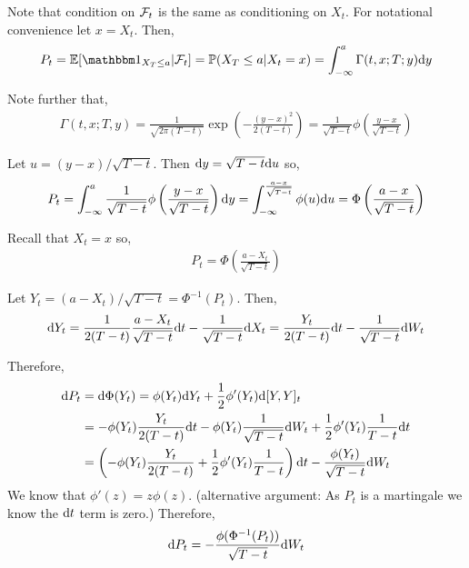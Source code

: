 \begin{solution}[Solution]
Note that condition on \( \mathcal{F}_t \) is the same as conditioning on \( X_t \). For notational convenience let \( x=X_t \). Then,
\begin{align*}
    P_t = \EE[\bOne_{X_T\leq a} | \cF_t] = \PP(X_T\leq a | X_t = x)
    = \int_{-\infty}^a \Gamma(t,x;T;y)\d y
\end{align*}

Note further that,
\begin{align*}
    \Gamma(t,x;T,y) = \frac{1}{\sqrt{2\pi (T-t)}}\exp \left( -\frac{(y-x)^2}{2(T-t)} \right) 
    = \frac{1}{\sqrt{T-t}}\phi \left( \frac{y-x}{\sqrt{T-t}} \right)
\end{align*}

    Let \( u = (y-x)/\sqrt{T-t} \). Then \( \mathrm{d} y = \sqrt{T-t} \mathrm{d} u \) so,
    \begin{align*}
       P_t
        = \int_{-\infty}^{a}  \frac{1}{\sqrt{T-t}}\phi \left( \frac{y-x}{\sqrt{T-t}} \right)\mathrm{d} y
        = \int_{-\infty}^{\frac{a-x}{\sqrt{T-t}}} \phi(u)\mathrm{d} u
        = \Phi \left( \frac{a-x}{\sqrt{T-t}} \right)
    \end{align*}
    
Recall that \( X_t = x \) so,
\begin{align*}
    P_t = \Phi \left( \frac{a-X_t}{\sqrt{T-t}} \right)
   \end{align*}


    Let \( Y_t = (a-X_t)/\sqrt{T-t} = \Phi^{-1}(P_t) \). Then,
    \begin{align*}
        \mathrm{d} Y_t = \frac{1}{2(T-t)} \frac{a-X_t}{\sqrt{T-t}}\mathrm{d} t-\frac{1}{\sqrt{T-t}}\mathrm{d} X_t 
        = \frac{Y_t}{2(T-t)} \mathrm{d} t - \frac{1}{\sqrt{T-t}}\mathrm{d} W_t
    \end{align*}
    
    Therefore,
    \begin{align*}
        \mathrm{d} P_t &= \mathrm{d} \Phi(Y_t) = \phi(Y_t)\mathrm{d} Y_t + \frac{1}{2} \phi'(Y_t)\mathrm{d}[Y,Y]_t 
        \\&= -\phi(Y_t) \frac{Y_t}{2(T-t)}\mathrm{d} t - \phi(Y_t) \frac{1}{\sqrt{T-t}}\mathrm{d} W_t + \frac{1}{2}\phi'(Y_t) \frac{1}{T-t}\mathrm{d} t
        \\&= \left(-\phi(Y_t) \frac{Y_t}{2(T-t)} + \frac{1}{2}\phi'(Y_t) \frac{1}{T-t} \right)\mathrm{d} t  - \frac{\phi(Y_t)}{\sqrt{T-t}}\mathrm{d} W_t 
    \end{align*}
    We know that \( \phi'(z) = z\phi(z) \).
    (alternative argument: As \( P_t \) is a martingale we know the \( \mathrm{d} t \) term is zero.) 
    Therefore,
    \begin{align*}
        \mathrm{d} P_t = -\frac{\phi(\Phi^{-1}(P_t))}{\sqrt{T-t}}\mathrm{d} W_t
    \end{align*}
    


\end{solution}




